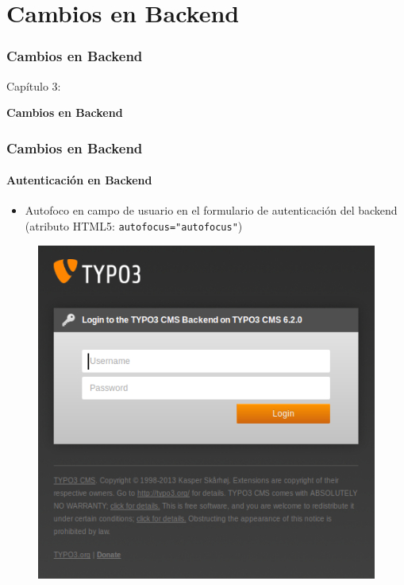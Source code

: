 %

\section{Cambios en Backend}
\begin{frame}[fragile]
	\frametitle{Cambios en Backend}

	\begin{center}\huge{Capítulo 3:}\end{center}
	\begin{center}\huge{\color{typo3darkgrey}\textbf{Cambios en Backend}}\end{center}

\end{frame}


\begin{frame}[fragile]
	\frametitle{Cambios en Backend}
	\framesubtitle{Autenticación en Backend}

 	\begin{itemize}
		\item Autofoco en campo de usuario en el formulario de autenticación del backend (atributo HTML5: \texttt{autofocus="autofocus"})
	\end{itemize}

	\begin{figure}
		\includegraphics[width=0.4\linewidth]{Images/BackendChanges/BackendLogin.png}
	\end{figure}

\end{frame}

